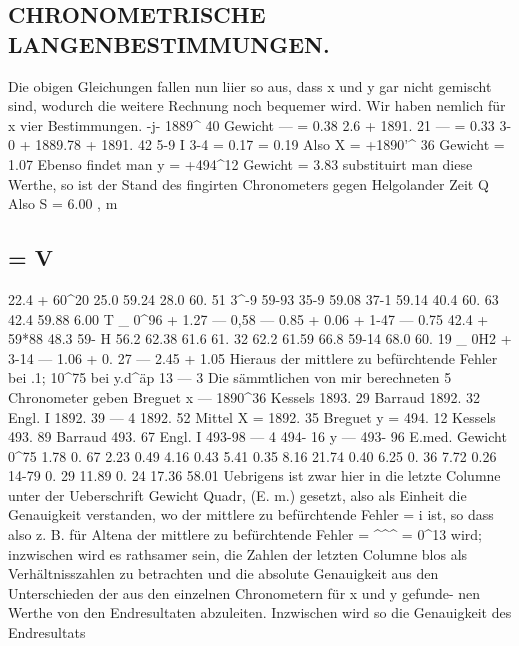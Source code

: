 \documentclass[10pt,a4paper]{article}
\begin{document}
\subsection*{CHRONOMETRISCHE  LANGENBESTIMMUNGEN.}

Die  obigen  Gleichungen  fallen  nun  liier  so  aus,  dass  x  und  y  gar  nicht  gemischt  sind,  wodurch
die  weitere  Rechnung  noch  bequemer  wird.     Wir  haben  nemlich  für  x  vier  Bestimmungen.
-j-  1889\textasciicircum{}  40  Gewicht   ---  =  0.38
2.6
+  1891.  21  ---  =  0.33
3-0
+  1889.78
+  1891. 42
5-9
I
3-4
=  0.17
=  0.19
Also   X  =  +1890'\textasciicircum{}  36  Gewicht        =  1.07
Ebenso  findet  man
y  =  +494\textasciicircum{}12     Gewicht        =  3.83
substituirt  man  diese  Werthe,  so  ist  der  Stand  des  fingirten  Chronometers  gegen  Helgolander  Zeit
Q
Also    S  =  6.00 ,    m
\subsection*{=  V}

22.4
+ 60\textasciicircum{}20
25.0
59.24
28.0
60.  51
3\textasciicircum{}-9
59-93
35-9
59.08
37-1
59.14
40.4
60.  63
42.4
59.88
6.00
T
\_
0\textasciicircum{}96
+
1.27
--- 0,58
---
0.85
+
0.06
+
1-47
---
0.75
42.4
+  59*88
48.3
59- H
56.2
62.38
61.6
61.  32
62.2
61.59
66.8
59-14
68.0
60. 19
\_ 0H2
+ 3-14
---
1.06
+
0.  27
---
2.45
+
1.05
Hieraus  der  mittlere  zu  befürchtende  Fehler  bei  .1;  10\textasciicircum{}75  bei  y.d\textasciicircum{}äp
13  ---  3
Die  sämmtlichen  von  mir  berechneten  5  Chronometer  geben
Breguet  x  ---  1890\textasciicircum{}36
Kessels  1893. 29
Barraud  1892. 32
Engl.  I  1892.  39
---      4  1892. 52
Mittel
X  =  1892.  35
Breguet     y  =    494. 12
Kessels  493. 89
Barraud  493. 67
Engl.  I  493-98
---      4
494-  16
y  ---    493-  96
E.med.
Gewicht
0\textasciicircum{}75
1.78
0.  67
2.23
0.49
4.16
0.43
5.41
0.35
8.16
21.74
0.40
6.25
0.  36
7.72
0.26
14-79
0.  29
11.89
0.  24
17.36
58.01
Uebrigens    ist  zwar   hier   in   die  letzte  Columne  unter    der  Ueberschrift   Gewicht
Quadr,  (E.  m.)
gesetzt,  also  als  Einheit  die  Genauigkeit  verstanden,  wo  der  mittlere  zu  befürchtende  Fehler  =  i\glqq{}  ist,
so  dass  also  z.  B.  für  Altena  der  mittlere  zu  befürchtende  Fehler  =  \textasciicircum{}\textasciicircum{}\textasciicircum{}  =  0\textasciicircum{}13  wird;  inzwischen  wird
es  rathsamer  sein,  die  Zahlen  der  letzten  Columne  blos  als  Verhältnisszahlen  zu  betrachten  und  die
absolute  Genauigkeit  aus  den  Unterschieden  der  aus  den  einzelnen  Chronometern  für  x  und  y  gefunde-
nen Werthe  von  den  Endresultaten  abzuleiten.     Inzwischen   wird  so   die   Genauigkeit  des  Endresultats
\end{document}
